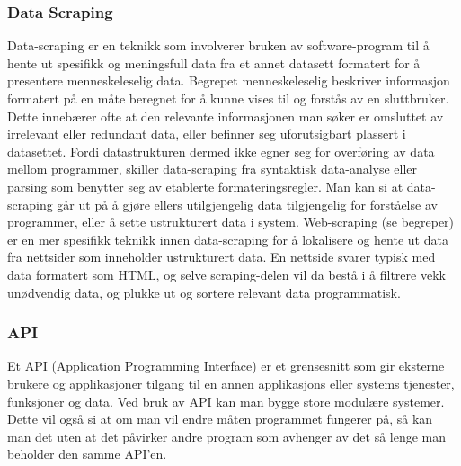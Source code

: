 \documentclass[../main.tex]{subfiles}
\begin{document}
\subsubsection{Data Scraping}
Data-scraping er en teknikk som involverer bruken av software-program til å hente ut spesifikk og meningsfull data fra et annet datasett formatert for å presentere menneskeleselig data.  \newline Begrepet menneskeleselig beskriver informasjon formatert på en måte beregnet for å kunne vises til og forstås av en sluttbruker. Dette innebærer ofte at den relevante informasjonen man søker er omsluttet av irrelevant eller redundant data, eller befinner seg uforutsigbart plassert i datasettet. Fordi datastrukturen dermed ikke egner seg for overføring av data mellom programmer, skiller data-scraping fra syntaktisk  data-analyse eller parsing som benytter seg av etablerte formateringsregler. Man kan si at data-scraping går ut på å gjøre ellers utilgjengelig data tilgjengelig for forståelse av programmer, eller å sette ustrukturert data i system.\newline
\newline
Web-scraping (se begreper) er en mer spesifikk teknikk innen data-scraping for å lokalisere og hente ut data fra nettsider som inneholder ustrukturert data. En nettside svarer typisk med data formatert som HTML, og selve scraping-delen vil da bestå i å filtrere vekk unødvendig data, og plukke ut og sortere relevant data programmatisk. 

\subsubsection{API}

Et API (Application Programming Interface) er et grensesnitt som gir eksterne brukere og applikasjoner tilgang til en annen applikasjons eller systems tjenester, funksjoner og data. Ved bruk av API kan man bygge store modulære systemer. Dette vil også si at om man vil endre måten programmet fungerer på, så kan man det uten at det påvirker andre program som avhenger av det så lenge man beholder den samme API’en. 
\end{document}
